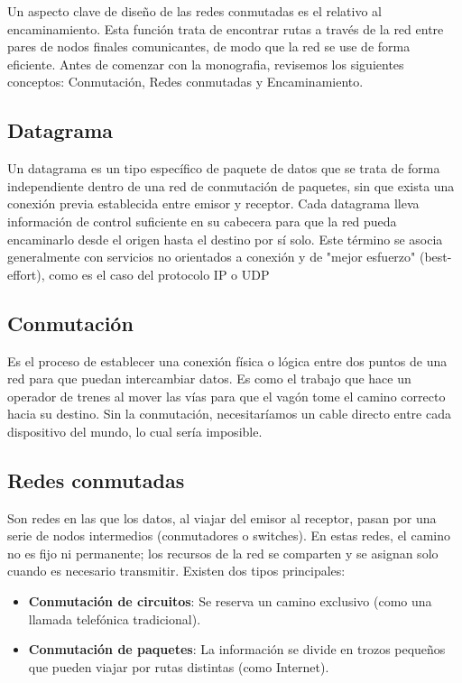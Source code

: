Un aspecto clave de diseño de las redes conmutadas es el relativo al encaminamiento. Esta función trata de encontrar rutas a través de la red entre pares de nodos finales comunicantes, de modo que la red se use de forma eficiente. Antes de comenzar con la monografia, revisemos los siguientes conceptos: Conmutación, Redes conmutadas y Encaminamiento.

\subsection{Datagrama}

Un datagrama es un tipo específico de paquete de datos que se trata de forma independiente dentro de una red de conmutación de paquetes, sin que exista una conexión previa establecida entre emisor y receptor. Cada datagrama lleva información de control suficiente en su cabecera para que la red pueda encaminarlo desde el origen hasta el destino por sí solo. Este término se asocia generalmente con servicios no orientados a conexión y de "mejor esfuerzo" (best-effort), como es el caso del protocolo IP o UDP

\subsection{Conmutación}

Es el proceso de establecer una conexión física o lógica entre dos puntos de una red para que puedan intercambiar datos. Es como el trabajo que hace un operador de trenes al mover las vías para que el vagón tome el camino correcto hacia su destino. Sin la conmutación, necesitaríamos un cable directo entre cada dispositivo del mundo, lo cual sería imposible.

\subsection{Redes conmutadas}

Son redes en las que los datos, al viajar del emisor al receptor, pasan por una serie de nodos intermedios (conmutadores o switches). En estas redes, el camino no es fijo ni permanente; los recursos de la red se comparten y se asignan solo cuando es necesario transmitir. Existen dos tipos principales:

\begin{itemize}
	\item \textbf{Conmutación de circuitos}: Se reserva un camino exclusivo (como una llamada telefónica tradicional).
	\item \textbf{Conmutación de paquetes}: La información se divide en trozos pequeños que pueden viajar por rutas distintas (como Internet).
\end{itemize}

